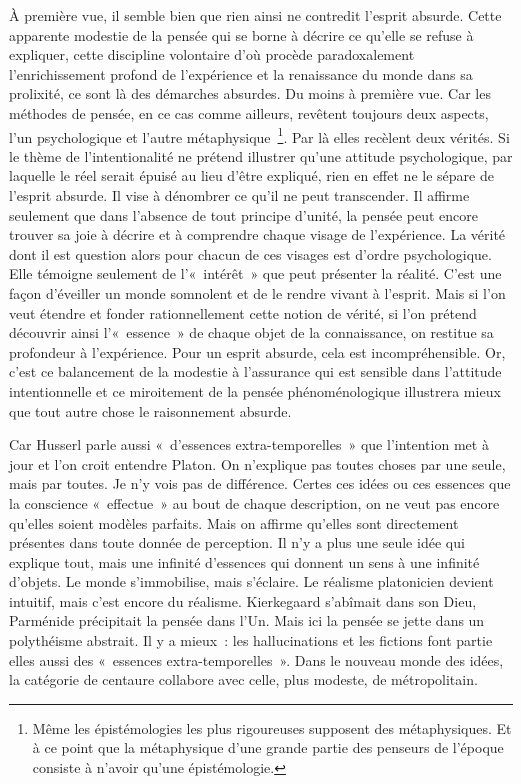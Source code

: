\documentclass{book}
\begin{document}
À première vue, il semble bien que rien ainsi ne contredit l'esprit absurde. Cette apparente modestie de la pensée qui se borne à décrire ce qu'elle se refuse à expliquer, cette discipline volontaire d'où procède paradoxalement l'enrichissement profond de l'expérience et la renaissance du monde dans sa prolixité, ce sont là des démarches absurdes. Du moins à première vue. Car les méthodes de pensée, en ce cas comme ailleurs, revêtent toujours deux aspects, l'un psychologique et l'autre métaphysique \footnote{Même les épistémologies les plus rigoureuses supposent des métaphysiques. Et à ce point que la métaphysique d’une grande partie des penseurs de l’époque consiste à n’avoir qu’une épistémologie.}. Par là elles recèlent deux vérités. Si le thème de l'intentionalité ne prétend illustrer qu'une attitude psychologique, par laquelle le réel serait épuisé au lieu d'être expliqué, rien en effet ne le sépare de l'esprit absurde. Il vise à dénombrer ce qu'il ne peut transcender. Il affirme seulement que dans l'absence de tout principe d'unité, la pensée peut encore trouver sa joie à décrire et à comprendre chaque visage de l'expérience. La vérité dont il est question alors pour chacun de ces visages est d'ordre psychologique. Elle témoigne seulement de l'« intérêt » que peut présenter la réalité. C'est une façon d'éveiller un monde somnolent et de le rendre vivant à l'esprit. Mais si l'on veut étendre et fonder rationnellement cette notion de vérité, si l'on prétend découvrir ainsi l’« essence » de chaque objet de la connaissance, on restitue sa profondeur à l'expérience. Pour un esprit absurde, cela est incompréhensible. Or, c'est ce balancement de la modestie à l'assurance qui est sensible dans l'attitude intentionnelle et ce miroitement de la pensée phénoménologique illustrera mieux que tout autre chose le raisonnement absurde.

Car Husserl parle aussi « d'essences extra-temporelles » que l'intention met à jour et l'on croit entendre Platon. On n'explique pas toutes choses par une seule, mais par toutes. Je n'y vois pas de différence. Certes ces idées ou ces essences que la conscience « effectue » au bout de chaque description, on ne veut pas encore qu'elles soient modèles parfaits. Mais on affirme qu'elles sont directement présentes dans toute donnée de perception. Il n'y a plus une seule idée qui explique tout, mais une infinité d'essences qui donnent un sens à une infinité d'objets. Le monde s'immobilise, mais s'éclaire. Le réalisme platonicien devient intuitif, mais c'est encore du réalisme. Kierkegaard s'abîmait dans son Dieu, Parménide précipitait la pensée dans l'Un. Mais ici la pensée se jette dans un polythéisme abstrait. Il y a mieux : les hallucinations et les fictions font partie elles aussi des « essences extra-temporelles ». Dans le nouveau monde des idées, la catégorie de centaure collabore avec celle, plus modeste, de métropolitain.
\end{document}
